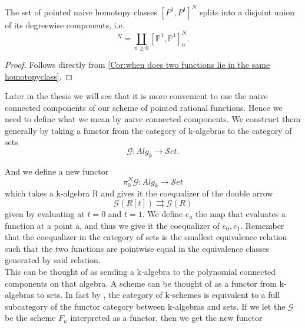 \fi
%
\begin{corollary}\label{cor:htpyclasses split degreewise}
The set of pointed naive homotopy classes \([P^1, P^1]^N\) splits into a disjoint union of its degreewise components, i.e. 
\begin{equation*}
    [\mathbb{P}^1,\mathbb{P}^1]^N = \coprod_{n\geq 0}[\mathbb{P}^1,\mathbb{P}^1]_n^N.
\end{equation*}
\begin{proof}
Follows directly from \cref{Cor:when does two functions lie in the same homotopyclass}.
\end{proof}
\end{corollary}
%
\begin{remark}\label{rm:reformulation to connected components}
Later in the thesis we will see that it is more convenient to use the naive connected components of our scheme of pointed rational functions. Hence we need to define what we mean by naive connected components. We construct them generally by taking a functor from the category of k-algebras to the category of sets  
\begin{equation*}
    \mathcal{G}:Alg_k \longrightarrow \mathcal{S}et .
\end{equation*}
\end{remark}
%
And we define a new functor
%
\begin{equation*}
    \pi_0^N\mathcal{G}:Alg_k \longrightarrow \mathcal{S}et
\end{equation*}
%
which takes a k-algebra R and gives it the coequalizer of the double arrow 
%
\begin{equation*}
    \mathcal{G}(R[t])\rightrightarrows \mathcal{G}(R)
\end{equation*}
%
given by evaluating at \(t=0\) and \(t=1\). We define \(e_a\) the map that evaluates a function at a point a, and thus we give it the coequalizer of \(e_0, e_1\). 
%
Remember that the coequalizer in the category of sets is the smallest equivalence relation such that the two functions are pointwise equal in the equivalence classes generated by said relation.  \\
This can be thought of as sending a k-algebra to the polynomial connected components on that algebra. 
%
A scheme can be thought of as a functor from k-algebras to sets. In fact by \cite[Prop. VI-2]{Eisenbud-Harris}, the category of k-schemes is equivalent to a full subcategory of the functor category between k-algebras and sets. If we let the \(\mathcal{G}\) be the scheme \(F_n\) interpreted as a functor, then we get the new functor

